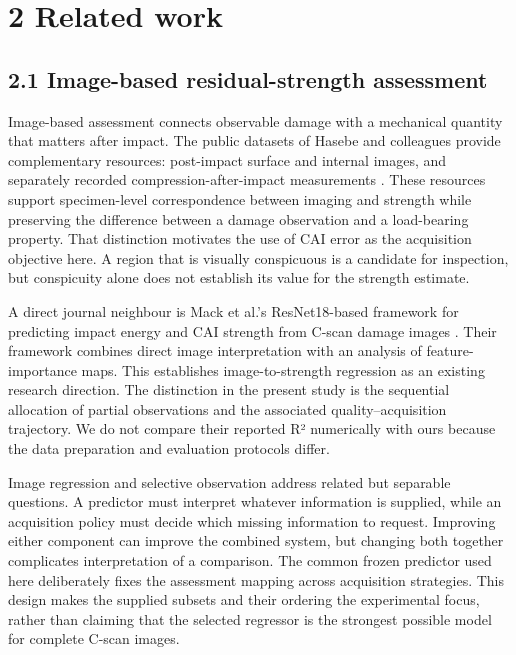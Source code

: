 \hypertarget{related-work}{%
\section{2 Related work}\label{related-work}}

\hypertarget{image-based-residual-strength-assessment}{%
\subsection{2.1 Image-based residual-strength assessment}\label{image-based-residual-strength-assessment}}

Image-based assessment connects observable damage with a mechanical quantity that matters after impact. The public datasets of Hasebe and colleagues provide complementary resources: post-impact surface and internal images, and separately recorded compression-after-impact measurements \citep{hasebe2022data, hasebe2025data}. These resources support specimen-level correspondence between imaging and strength while preserving the difference between a damage observation and a load-bearing property. That distinction motivates the use of CAI error as the acquisition objective here. A region that is visually conspicuous is a candidate for inspection, but conspicuity alone does not establish its value for the strength estimate.

A direct journal neighbour is Mack et al.'s ResNet18-based framework for predicting impact energy and CAI strength from C-scan damage images \citep{mack2026}. Their framework combines direct image interpretation with an analysis of feature-importance maps. This establishes image-to-strength regression as an existing research direction. The distinction in the present study is the sequential allocation of partial observations and the associated quality--acquisition trajectory. We do not compare their reported R² numerically with ours because the data preparation and evaluation protocols differ.

Image regression and selective observation address related but separable questions. A predictor must interpret whatever information is supplied, while an acquisition policy must decide which missing information to request. Improving either component can improve the combined system, but changing both together complicates interpretation of a comparison. The common frozen predictor used here deliberately fixes the assessment mapping across acquisition strategies. This design makes the supplied subsets and their ordering the experimental focus, rather than claiming that the selected regressor is the strongest possible model for complete C-scan images.

